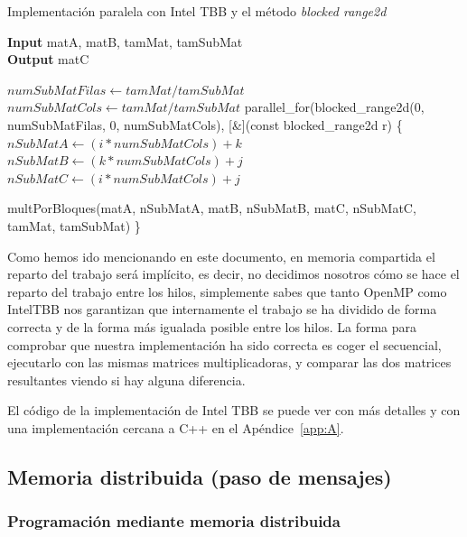 \documentclass[a4paper,12pt]{article}
\begin{document}
\begin{algorithm}[htbp]
	\caption{Implementación paralela con Intel TBB y el método {\it blocked range2d}}
    \hspace*{\algorithmicindent} \textbf{Input} matA, matB, tamMat, tamSubMat\\
    \hspace*{\algorithmicindent} \textbf{Output} matC
	\begin{algorithmic}[1]
	    \State $numSubMatFilas \leftarrow tamMat/tamSubMat$
		\State $numSubMatCols \leftarrow tamMat/tamSubMat$
		\State parallel\_for(blocked\_range2d(0, numSubMatFilas, 0, numSubMatCols), [\&](const blocked\_range2d  r)
		\State \{
				\State $nSubMatA \leftarrow (i * numSubMatCols) + k$ 
				\State $nSubMatB \leftarrow  (k * numSubMatCols) + j$
				\State $nSubMatC \leftarrow  (i * numSubMatCols) + j$
				
				\State multPorBloques(matA, nSubMatA, matB, nSubMatB, matC, nSubMatC, tamMat, tamSubMat)
            \EndFor
        \EndFor
		\EndFor
        \State \}
	\end{algorithmic}
	\label{alg:tbb}
\end{algorithm}

Como hemos ido mencionando en este documento, en memoria compartida el reparto del trabajo será implícito, es decir, no decidimos nosotros cómo se hace el reparto del trabajo entre los hilos, simplemente sabes que tanto OpenMP como IntelTBB nos garantizan que internamente el trabajo se ha dividido de forma correcta y de la forma más igualada posible entre los hilos. La forma para comprobar que nuestra implementación ha sido correcta es coger el secuencial, ejecutarlo con las mismas matrices multiplicadoras, y comparar las dos matrices resultantes viendo si hay alguna diferencia.

El código de la implementación de Intel TBB se puede ver con más detalles y con una implementación cercana a C++ en el Apéndice~\ref{app:A}.

\subsection{Memoria distribuida (paso de mensajes)}
\subsubsection{Programación mediante memoria distribuida}
\end{document}
